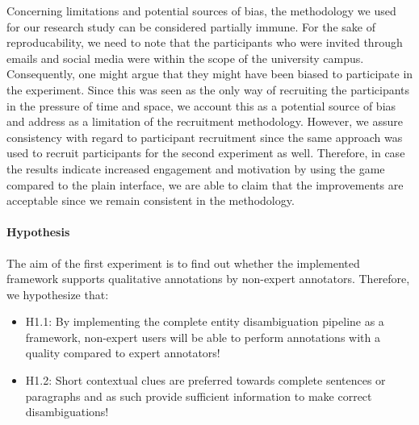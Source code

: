
Concerning limitations and potential sources of bias, the methodology we used for our research study can be considered partially immune. For the sake of reproducability, we need to note that the participants who were invited through emails and social media were within the scope of the university campus. Consequently, one might argue that they might have been biased to participate in the experiment. Since this was seen as the only way of recruiting the participants in the pressure of time and space, we account this as a potential source of bias and address as a limitation of the recruitment methodology. However, we assure consistency with regard to participant recruitment since the same approach was used to recruit participants for the second experiment as well. Therefore, in case the results indicate increased engagement and motivation by using the game compared to the plain interface, we are able to claim that the improvements are acceptable since we remain consistent in the methodology. 

\paragraph{Hypothesis}
The aim of the first experiment is to find out whether the implemented framework supports qualitative annotations by non-expert annotators. Therefore, we hypothesize that:

\begin{itemize}
    \item H1.1: By implementing the complete entity disambiguation pipeline as a framework, non-expert users will be able to perform annotations with a quality compared to expert annotators!
    \item H1.2: Short contextual clues are preferred towards complete sentences or paragraphs and as such provide sufficient information to make correct disambiguations! 
\end{itemize}



